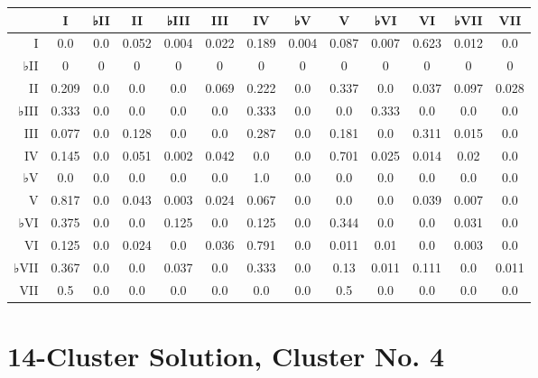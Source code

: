 \begin{table}[htbp]
\begin{minipage}{\linewidth}
\setlength{\tymax}{0.5\linewidth}
\centering
\small
\begin{tabulary}{\textwidth}{@{}RCCCCCCCCCCCC@{}} \toprule
&I&♭II&II&♭III&III&IV&♭V&V&♭VI&VI&♭VII&VII\\
\midrule
I&0.0&0.0&0.052&0.004&0.022&0.189&0.004&0.087&0.007&0.623&0.012&0.0\\
♭II&0&0&0&0&0&0&0&0&0&0&0&0\\
II&0.209&0.0&0.0&0.0&0.069&0.222&0.0&0.337&0.0&0.037&0.097&0.028\\
♭III&0.333&0.0&0.0&0.0&0.0&0.333&0.0&0.0&0.333&0.0&0.0&0.0\\
III&0.077&0.0&0.128&0.0&0.0&0.287&0.0&0.181&0.0&0.311&0.015&0.0\\
IV&0.145&0.0&0.051&0.002&0.042&0.0&0.0&0.701&0.025&0.014&0.02&0.0\\
♭V&0.0&0.0&0.0&0.0&0.0&1.0&0.0&0.0&0.0&0.0&0.0&0.0\\
V&0.817&0.0&0.043&0.003&0.024&0.067&0.0&0.0&0.0&0.039&0.007&0.0\\
♭VI&0.375&0.0&0.0&0.125&0.0&0.125&0.0&0.344&0.0&0.0&0.031&0.0\\
VI&0.125&0.0&0.024&0.0&0.036&0.791&0.0&0.011&0.01&0.0&0.003&0.0\\
♭VII&0.367&0.0&0.0&0.037&0.0&0.333&0.0&0.13&0.011&0.111&0.0&0.011\\
VII&0.5&0.0&0.0&0.0&0.0&0.0&0.0&0.5&0.0&0.0&0.0&0.0\\

\bottomrule

\end{tabulary}
\end{minipage}
\end{table}

\section{14-Cluster Solution, Cluster No. 4}
\label{14-clustersolutionclusterno.4}

